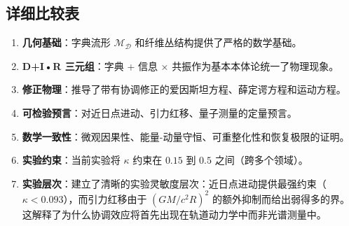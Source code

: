 \documentclass[11pt,a4paper]{article}
\begin{document}
	\subsection{详细比较表}
	\begin{enumerate}
		\item \textbf{几何基础}：字典流形 $\mathcal{M}_{\mathcal{D}}$ 和纤维丛结构提供了严格的数学基础。
		
		\item \textbf{D+I•R 三元组}：字典 + 信息 × 共振作为基本本体论统一了物理现象。
		
		\item \textbf{修正物理}：推导了带有协调修正的爱因斯坦方程、薛定谔方程和运动方程。
		
		\item \textbf{可检验预言}：对近日点进动、引力红移、量子测量的定量预言。
		
		\item \textbf{数学一致性}：微观因果性、能量-动量守恒、可重整化性和恢复极限的证明。
		
		\item \textbf{实验约束}：当前实验将 $\kappa$ 约束在 $0.15$ 到 $0.5$ 之间（跨多个领域）。
		
		\item \textbf{实验层次}：建立了清晰的实验灵敏度层次：近日点进动提供最强约束（$\kappa < 0.093$），而引力红移由于 $(GM/c^2R)^2$ 的额外抑制而给出弱得多的界。这解释了为什么协调效应将首先出现在轨道动力学中而非光谱测量中。
	\end{enumerate}
\end{document}
